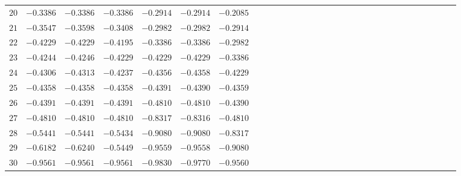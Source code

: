 \begin{table}[!htbp]
\begin{tabular}{c c c c c c c c c c c c c c c c c c c c c c c c c c c c c c c }
$20$&$-0.3386$&$-0.3386$&$-0.3386$&$-0.2914$&$-0.2914$&$ -0.2085$\\
$21$&$-0.3547$&$-0.3598$&$-0.3408$&$-0.2982$&$-0.2982$&$ -0.2914$\\
$22$&$-0.4229$&$-0.4229$&$-0.4195$&$-0.3386$&$-0.3386$&$ -0.2982$\\
$23$&$-0.4244$&$-0.4246$&$-0.4229$&$-0.4229$&$-0.4229$&$ -0.3386$\\
$24$&$-0.4306$&$-0.4313$&$-0.4237$&$-0.4356$&$-0.4358$&$ -0.4229$\\
$25$&$-0.4358$&$-0.4358$&$-0.4358$&$-0.4391$&$-0.4390$&$ -0.4359$\\
$26$&$-0.4391$&$-0.4391$&$-0.4391$&$-0.4810$&$-0.4810$&$ -0.4390$\\
$27$&$-0.4810$&$-0.4810$&$-0.4810$&$-0.8317$&$-0.8316$&$ -0.4810$\\
$28$&$-0.5441$&$-0.5441$&$-0.5434$&$-0.9080$&$-0.9080$&$ -0.8317$\\
$29$&$-0.6182$&$-0.6240$&$-0.5449$&$-0.9559$&$-0.9558$&$ -0.9080$\\
$30$&$-0.9561$&$-0.9561$&$-0.9561$&$-0.9830$&$-0.9770$&$ -0.9560$\\
   
   

    
     \hline 

\end{tabular}
\end{table}






